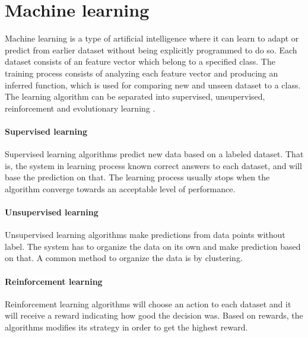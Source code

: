 \documentclass[USenglish]{ifimaster}  %
\begin{document}


\section {Machine learning}
Machine learning is a type of artificial intelligence where it can learn to adapt or predict from earlier dataset without being explicitly programmed to do so. Each dataset consists of an feature vector which belong to a specified class. The training process consists of analyzing each feature vector and producing an inferred function, which is used for comparing new and unseen dataset to a class. The learning algorithm can be separated into supervised, unsupervised, reinforcement and evolutionary learning \cite{Marsland:2009:MLA:1571643}.

\paragraph{Supervised learning}
Supervised learning algorithms predict new data based on a labeled dataset. That is, the system in learning process known correct answers to each dataset, and will base the prediction on that. The learning process usually stops when the algorithm converge towards an acceptable level of performance.
	
\paragraph{Unsupervised learning}
Unsupervised learning algorithms make predictions from data points without label. The system has to organize the data on its own and make prediction based on that. A common method to organize the data is by clustering.
	
\paragraph{Reinforcement learning}
Reinforcement learning algorithms will choose an action to each dataset and it will receive a reward indicating how good the decision was. Based on rewards, the algorithms modifies its strategy in order to get the highest reward. 
	
\end{document}
